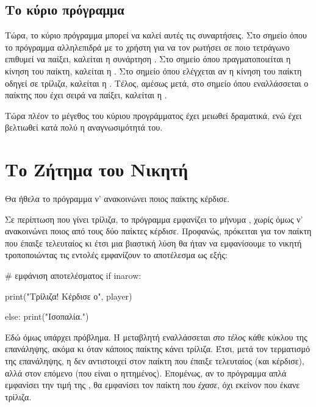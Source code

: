 \documentclass[a4paper,11pt,oneside]{book}
\begin{document}
\subsection{Το κύριο πρόγραμμα}

Τώρα, το κύριο πρόγραμμα μπορεί να καλεί αυτές τις συναρτήσεις. Στο σημείο όπου το πρόγραμμα αλληλεπιδρά με το χρήστη για να τον ρωτήσει σε ποιο τετράγωνο επιθυμεί να παίξει, καλείται η συνάρτηση . Στο σημείο όπου πραγματοποιείται η κίνηση του παίκτη, καλείται η . Στο σημείο όπου ελέγχεται αν η κίνηση του παίκτη οδηγεί σε τρίλιζα, καλείται η . Τέλος, αμέσως μετά, στο σημείο όπου εναλλάσσεται ο παίκτης που έχει σειρά να παίξει, καλείται η .


Τώρα πλέον το μέγεθος του κύριου προγράμματος έχει μειωθεί δραματικά, ενώ έχει βελτιωθεί κατά πολύ η αναγνωσιμότητά του.

\section{Το Ζήτημα του Νικητή}

\begin{question}
Θα ήθελα το πρόγραμμα ν' ανακοινώνει ποιος παίκτης κέρδισε.
\end{question}

Σε περίπτωση που γίνει τρίλιζα, το πρόγραμμα εμφανίζει το μήνυμα , χωρίς όμως ν' ανακοινώνει ποιος από τους δύο παίκτες κέρδισε. Προφανώς, πρόκειται για τον παίκτη που έπαιξε τελευταίος κι έτσι μια βιαστική λύση θα ήταν να εμφανίσουμε το νικητή τροποποιώντας τις εντολές εμφανίζουν το αποτέλεσμα ως εξής:

\begin{pyplain}
# εμφάνιση αποτελέσματος
if inarow:
\end{pyplain}
\begin{pynew}
    print("Τρίλιζα! Κέρδισε ο", player)
\end{pynew}
\begin{pyplain}
else:
    print("Ισοπαλία.")
\end{pyplain}

Εδώ όμως υπάρχει πρόβλημα. Η μεταβλητή  εναλλάσσεται \emph{στο τέλος} κάθε κύκλου της επανάληψης, ακόμα κι όταν κάποιος παίκτης κάνει τρίλιζα. Έτσι, μετά τον τερματισμό της επανάληψης, η  δεν αντιστοιχεί στον παίκτη που έπαιξε τελευταίος (και κέρδισε), αλλά στον επόμενο (που είναι ο ηττημένος). Επομένως, αν το πρόγραμμα απλά εμφανίσει την τιμή της , θα εμφανίσει τον παίκτη που \emph{έχασε}, όχι εκείνον που έκανε τρίλιζα. 
\end{document}
